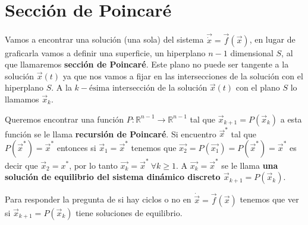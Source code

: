 \section{Sección de Poincaré}

Vamos a encontrar una solución (una sola) del sistema $\vec{\dot{x}}=\vec{f}(\vec{x})$, en lugar de graficarla vamos a definir una superficie, un hiperplano $n-1$ dimensional $S$, al que llamaremos \textbf{sección de Poincaré}. Este plano no puede ser tangente a la solución $\vec{x}(t)$ ya que nos vamos a fijar en las intersecciones de la solución con el hiperplano $S$. A la $k-\text{ésima}$ intersección de la solución $\vec{x}(t)$ con el plano $S$ lo llamamos $\vec{x}_k$.

\begin{figure}[H]
 \centering
\end{figure} 

Queremos encontrar una función $P: \mathbb{R}^{n-1} \to \mathbb{R}^{n-1}$ tal que $\vec{x}_{k+1}=P(\vec{x}_k)$ a esta función se le llama  \textbf{recursión de Poincaré}. Si encuentro $\vec{x}^*$ tal que $P(\vec{x}^*)=\vec{x}^*$ entonces si $\vec{x}_1=\vec{x}^*$ tenemos que $\vec{x_2}=P(\vec{x_1})=P(\vec{x}^*)=\vec{x}^*$ es decir que $\vec{x}_2=x^*$, por lo tanto $\vec{x_k}=\vec{x}^* \ \forall k \ge 1$. A $\vec{x_k}=\vec{x}^*$ se le llama \textbf{una solución de equilibrio del sistema dinámico discreto $\vec{x}_{k+1}=P(\vec{x}_k)$}. 

\begin{tcolorbox}[colback=Black!4, colframe=White,arc=2mm]
\begin{nota}
	Para responder la pregunta de si hay ciclos o no en $\dot{\vec{x}}=\vec{f}(\vec{x})$ tenemos que ver si $\vec{x}_{k+1}=P(\vec{x}_k)$ tiene soluciones de equilibrio.
\end{nota}
\end{tcolorbox}

